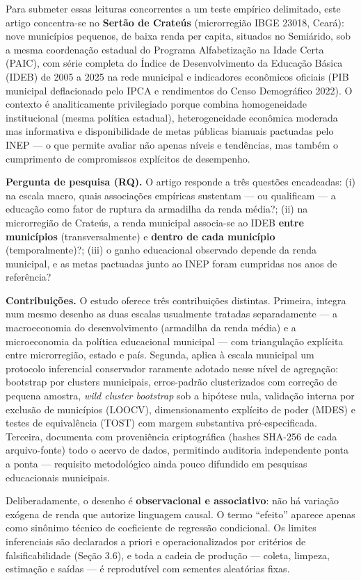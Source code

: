 \documentclass[
  brazilian,
  12pt,
  a4paper,
]{article}
\begin{document}
Para submeter essas leituras concorrentes a um teste empírico
delimitado, este artigo concentra-se no \textbf{Sertão de Crateús}
(microrregião IBGE 23018, Ceará): nove municípios pequenos, de baixa
renda per capita, situados no Semiárido, sob a mesma coordenação
estadual do Programa Alfabetização na Idade Certa (PAIC), com série
completa do Índice de Desenvolvimento da Educação Básica (IDEB) de 2005
a 2025 na rede municipal e indicadores econômicos oficiais (PIB
municipal deflacionado pelo IPCA e rendimentos do Censo Demográfico
2022). O contexto é analiticamente privilegiado porque combina
homogeneidade institucional (mesma política estadual), heterogeneidade
econômica moderada mas informativa e disponibilidade de metas públicas
bianuais pactuadas pelo INEP --- o que permite avaliar não apenas níveis
e tendências, mas também o cumprimento de compromissos explícitos de
desempenho.

\textbf{Pergunta de pesquisa (RQ).} O artigo responde a três questões
encadeadas: (i) na escala macro, quais associações empíricas sustentam
--- ou qualificam --- a educação como fator de ruptura da armadilha da
renda média?; (ii) na microrregião de Crateús, a renda municipal
associa-se ao IDEB \textbf{entre municípios} (transversalmente) e
\textbf{dentro de cada município} (temporalmente)?; (iii) o ganho
educacional observado depende da renda municipal, e as metas pactuadas
junto ao INEP foram cumpridas nos anos de referência?

\textbf{Contribuições.} O estudo oferece três contribuições distintas.
Primeira, integra num mesmo desenho as duas escalas usualmente tratadas
separadamente --- a macroeconomia do desenvolvimento (armadilha da renda
média) e a microeconomia da política educacional municipal --- com
triangulação explícita entre microrregião, estado e país. Segunda,
aplica à escala municipal um protocolo inferencial conservador raramente
adotado nesse nível de agregação: bootstrap por clusters municipais,
erros-padrão clusterizados com correção de pequena amostra, \emph{wild
cluster bootstrap} sob a hipótese nula, validação interna por exclusão
de municípios (LOOCV), dimensionamento explícito de poder (MDES) e
testes de equivalência (TOST) com margem substantiva pré-especificada.
Terceira, documenta com proveniência criptográfica (hashes SHA-256 de
cada arquivo-fonte) todo o acervo de dados, permitindo auditoria
independente ponta a ponta --- requisito metodológico ainda pouco
difundido em pesquisas educacionais municipais.

Deliberadamente, o desenho é \textbf{observacional e associativo}: não
há variação exógena de renda que autorize linguagem causal. O termo
``efeito'' aparece apenas como sinônimo técnico de coeficiente de
regressão condicional. Os limites inferenciais são declarados a priori e
operacionalizados por critérios de falsificabilidade (Seção 3.6), e toda
a cadeia de produção --- coleta, limpeza, estimação e saídas --- é
reprodutível com sementes aleatórias fixas.
\end{document}
